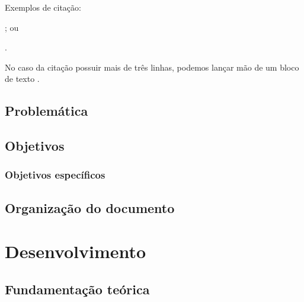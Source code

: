 \documentclass[
    12pt,               %
    openright,          %
    oneside,            %
    a4paper,            %
    english,            %
    french,             %
    spanish,            %
    brazil              %
    ]{abntex2}
\begin{document}
Exemplos de cita\c cão: 

\cite[p. 10]{author2020}; ou 

.

\begin{citacao}
No caso da cita\c cão possuir mais de três linhas, podemos lan\c car mão de um bloco de texto \cite[p. 44]{author2020}.
\end{citacao}

\section{Problemática}

\section{Objetivos}

\subsection{Objetivos específicos}

\section{Organização do documento}



\chapter{Desenvolvimento}
\section{Fundamentação teórica}
\end{document}

